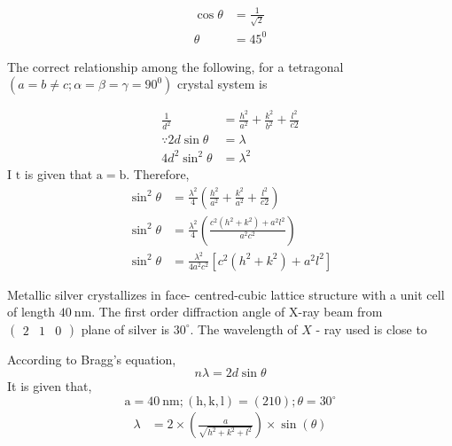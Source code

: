 \begin{enumerate}
\begin{answer}
$$\begin{aligned}
		\cos \theta &=\frac{1}{\sqrt{2}} \\
		\theta &=45^{0}
		\end{aligned}$$	
	\end{answer}
	\begin{minipage}{\textwidth}
		\item The correct relationship among the following, for a tetragonal $\left(a=b \neq c ; \alpha=\beta=\gamma=90^{0}\right)$ crystal system is
	\end{minipage}
	\begin{answer}
		$$
		\begin{aligned}
		\frac{1}{d^{2}} &=\frac{h^{2}}{a^{2}}+\frac{k^{2}}{b^{2}}+\frac{l^{2}}{c 2} \\
		\because 2 d \sin \theta &=\lambda \\
		4 d^{2} \sin ^{2} \theta &=\lambda^{2}
		\end{aligned}
		$$
		I $\mathrm{t}$ is given that $\mathrm{a}=\mathrm{b}$. Therefore,
		$$
		\begin{aligned}
		\sin ^{2} \theta &=\frac{\lambda^{2}}{4}\left(\frac{h^{2}}{a^{2}}+\frac{k^{2}}{a^{2}}+\frac{l^{2}}{c 2}\right) \\
		\sin ^{2} \theta &=\frac{\lambda^{2}}{4}\left(\frac{c^{2}\left(h^{2}+k^{2}\right)+a^{2} l^{2}}{a^{2} c^{2}}\right) \\
		\sin ^{2} \theta &=\frac{\lambda^{2}}{4 a^{2} c^{2}}\left[c^{2}\left(h^{2}+k^{2}\right)+a^{2} l^{2}\right]
		\end{aligned}
		$$	
	\end{answer}
	\begin{minipage}{\textwidth}
		\item Metallic silver crystallizes in face- centred-cubic lattice structure with a unit cell of length $40 \mathrm{~nm}$. The first order diffraction angle of $\mathrm{X}$-ray beam from $\left(\begin{array}{lll}2 & 1 & 0\end{array}\right)$ plane of silver is $30^{\circ} .$ The wavelength of $X$ - ray used is close to
	\end{minipage}
	\begin{answer}
		According to Bragg's equation,
		$$
		n \lambda=2 d \sin \theta
		$$
		It is given that,
		$$
		\mathrm{a}=40 \mathrm{~nm} ;(\mathrm{h}, \mathrm{k}, \mathrm{l})=(210) ; \theta=30^{\circ}
		$$
		$$
		\begin{aligned}
		\lambda &=2 \times\left(\frac{a}{\sqrt{h^{2}+k^{2}+l^{2}}}\right) \times \sin (\theta) \\

\end{aligned}$$
\end{answer}
\end{enumerate}
